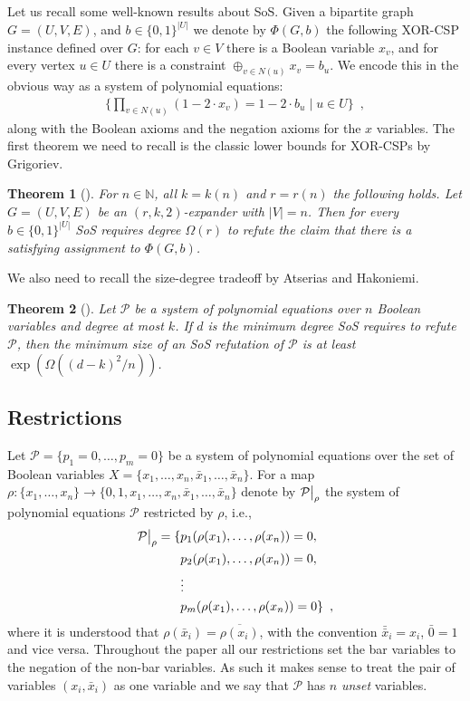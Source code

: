 \documentclass[10pt,a4paper]{article}
\theoremstyle{plain}
\newtheorem{theorem}{Theorem}[section]
\theoremstyle{remark}
\theoremstyle{definition}
\newcommand{\eqcomma}{\enspace ,}
\newcommand{\set}[1]{\{#1\}}
\newcommand\restrict[2]{{%
  \left.\kern-\nulldelimiterspace %
  #1 %
  \vphantom{\big|} %
  \right|_{#2} %
  }}
\newcommand{\calP}{\mathcal{P}}
\newcommand{\N}{\mathbb{N}}
\begin{document}
Let us recall some well-known results about SoS. Given a bipartite
graph $G = (U, V, E)$, and $b \in \set{0,1}^{|U|}$ we denote by
$\Phi(G,b)$ the following XOR-CSP instance defined over $G$: for each
$v \in V$ there is a Boolean variable $x_v$, and for every vertex
$u \in U$ there is a constraint $\oplus_{v \in N(u)} x_v = b_u$.
We encode this in the obvious way as a system of polynomial equations: 
\begin{align*}
  \big\{
  \prod_{v \in N(u)} (1 - 2 \cdot x_v) = 1 - 2 \cdot b_u
  \mid u \in U
  \big\} \eqcomma
\end{align*}
along with the Boolean axioms and the negation axioms for the $x$
variables. The first theorem we need to recall is the classic lower
bounds for XOR-CSPs by Grigoriev.

\begin{theorem}[\cite{gri01xor}]\label{thm:sos-xor}
  For $n \in \N$, all $k = k(n)$ and $r = r(n)$ the following holds.
  Let $G = (U, V, E)$ be an $(r, k, 2)$-expander with $|V| = n$. Then
  for every $b \in \set{0,1}^{|U|}$ SoS requires degree $\Omega(r)$ to
  refute the claim that there is a satisfying assignment to
  $\Phi(G, b)$.
\end{theorem}

We also need to recall the size-degree tradeoff by Atserias and
Hakoniemi.

\begin{theorem}[\cite{AH18SosTradeoff}]\label{thm:tradeoff}
  Let $\calP$ be a system of polynomial equations over $n$ Boolean
  variables and degree at most $k$. If $d$ is the minimum degree
  SoS requires to refute $\calP$, then the minimum size of an SoS
  refutation of $\calP$ is at least $\exp(\Omega((d-k)^2/n))$.
\end{theorem}


\subsection{Restrictions}
\label{sec:restrictions}

Let $\calP = \set{p_1 = 0, \ldots, p_m = 0}$ be a system of polynomial
equations over the set of Boolean variables
$X = \set{x_1, \ldots, x_n, \bar{x}_1, \ldots, \bar{x}_n}$.
%
For a map
$\rho: \set{x_1, \ldots, x_n} \to \set{0,1, x_1, \ldots, x_n,
  \bar{x}_1, \ldots, \bar{x}_n}$ denote by $\restrict{\calP}{\rho}$
the system of polynomial equations $\calP$ restricted by $\rho$, i.e.,
\begin{align*}
\restrict{\calP}{\rho} = \set{ &p_1(\rho(x_1), \ldots, \rho(x_n)) = 0,\\
  &p_2(\rho(x_1), \ldots, \rho(x_n)) = 0,\\ &\vdots\\ &p_m(\rho(x_1),
  \ldots, \rho(x_n)) = 0 }\eqcomma
\end{align*}
where it is understood that $\rho(\bar x_i) = \overline{\rho(x_i)}$,
with the convention $\bar{\bar{x}}_i = x_i$, $\bar 0 = 1$ and vice
versa. Throughout the paper all our restrictions set the bar variables
to the negation of the non-bar variables. As such it makes sense to
treat the pair of variables $(x_i, \bar x_i)$ as one variable and we
say that $\calP$ has $n$ \emph{unset} variables.
\end{document}
